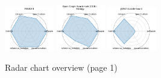\begin{figure}[ht!]
\includegraphics[width=0.1900\textwidth]{images/molgen_radar.pdf}
\includegraphics[width=0.1900\textwidth]{images/open_graph_benchmark_ogb_-_biology_radar.pdf}
\includegraphics[width=0.1900\textwidth]{images/jarvis-leaderboard_radar.pdf}
\\[1ex]
\caption{Radar chart overview (page 1)}
\end{figure}


\clearpage


